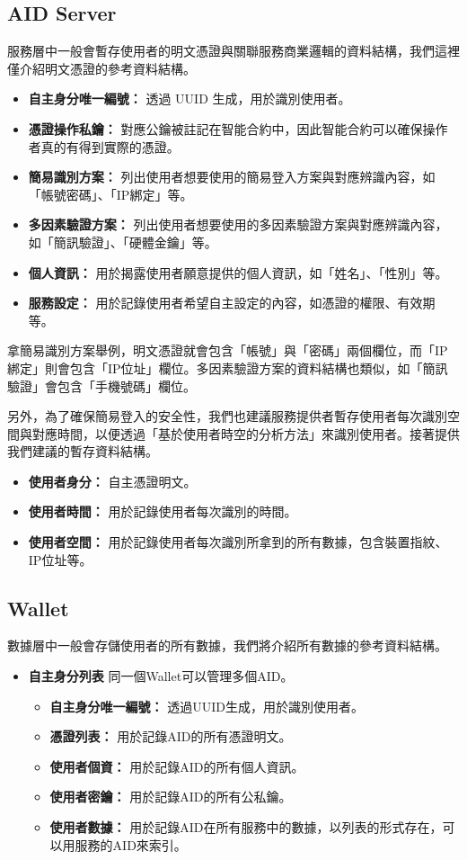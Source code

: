 \subsection{AID Server}
服務層中一般會暫存使用者的明文憑證與關聯服務商業邏輯的資料結構，我們這裡僅介紹明文憑證的參考資料結構。
\begin{itemize}
  \item \textbf{自主身分唯一編號：} 透過 UUID 生成，用於識別使用者。
  \item \textbf{憑證操作私鑰：} 對應公鑰被註記在智能合約中，因此智能合約可以確保操作者真的有得到實際的憑證。
  \item \textbf{簡易識別方案：} 列出使用者想要使用的簡易登入方案與對應辨識內容，如「帳號密碼」、「IP綁定」等。
  \item \textbf{多因素驗證方案：} 列出使用者想要使用的多因素驗證方案與對應辨識內容，如「簡訊驗證」、「硬體金鑰」等。
  \item \textbf{個人資訊：} 用於揭露使用者願意提供的個人資訊，如「姓名」、「性別」等。
  \item \textbf{服務設定：} 用於記錄使用者希望自主設定的內容，如憑證的權限、有效期等。
\end{itemize}
拿簡易識別方案舉例，明文憑證就會包含「帳號」與「密碼」兩個欄位，而「IP綁定」則會包含「IP位址」欄位。多因素驗證方案的資料結構也類似，如「簡訊驗證」會包含「手機號碼」欄位。

另外，為了確保簡易登入的安全性，我們也建議服務提供者暫存使用者每次識別空間與對應時間，以便透過「基於使用者時空的分析方法」來識別使用者。接著提供我們建議的暫存資料結構。
\begin{itemize}
  \item \textbf{使用者身分：} 自主憑證明文。
  \item \textbf{使用者時間：} 用於記錄使用者每次識別的時間。
  \item \textbf{使用者空間：} 用於記錄使用者每次識別所拿到的所有數據，包含裝置指紋、IP位址等。
\end{itemize}
\subsection{Wallet}
數據層中一般會存儲使用者的所有數據，我們將介紹所有數據的參考資料結構。
\begin{itemize}
  \item \textbf{自主身分列表} 同一個Wallet可以管理多個AID。
        \begin{itemize}
          \item \textbf{自主身分唯一編號：} 透過UUID生成，用於識別使用者。
          \item \textbf{憑證列表：} 用於記錄AID的所有憑證明文。
          \item \textbf{使用者個資：} 用於記錄AID的所有個人資訊。
          \item \textbf{使用者密鑰：} 用於記錄AID的所有公私鑰。
          \item \textbf{使用者數據：} 用於記錄AID在所有服務中的數據，以列表的形式存在，可以用服務的AID來索引。
        \end{itemize}
\end{itemize}
